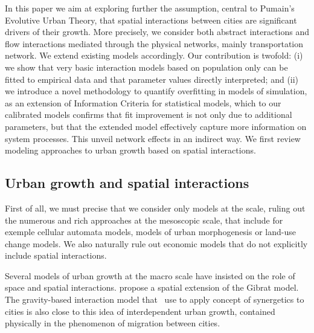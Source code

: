\documentclass[Royal,sageh,times]{sagej}
\begin{document}
In this paper we aim at exploring further the assumption, central to Pumain's Evolutive Urban Theory, that spatial interactions between cities are significant drivers of their growth. More precisely, we consider both abstract interactions and flow interactions mediated through the physical networks, mainly  transportation network. We extend existing models accordingly. Our contribution is twofold: (i) we show that very basic interaction models based on population only can be fitted to empirical data and that  parameter values  directly interpreted; and (ii) we introduce a novel methodology to quantify overfitting in models of simulation, as an extension of Information Criteria for statistical models, which  to our calibrated models confirms that fit improvement is not only due to additional parameters, but that the extended model effectively capture more information on system processes. This unveil network effects in an indirect way. We first review modeling approaches to urban growth based on spatial interactions.


\subsection*{Urban growth and spatial interactions}

First of all, we must precise that we consider only models at the  scale, ruling out the numerous and rich approaches at the mesoscopic scale, that include for exemple cellular automata models, models of urban morphogenesis or land-use change models.  We also naturally rule out economic models that do not explicitly include spatial interactions.

Several models of urban growth at the macro scale have insisted on the role of space and spatial interactions.  \cite{bretagnolle2000long} propose a spatial extension of the Gibrat model. The gravity-based interaction model that~\cite{sanders1992systeme} use to apply concept of synergetics to cities is also close to this idea of interdependent urban growth, contained physically in the phenomenon of migration between cities. 
\end{document}
